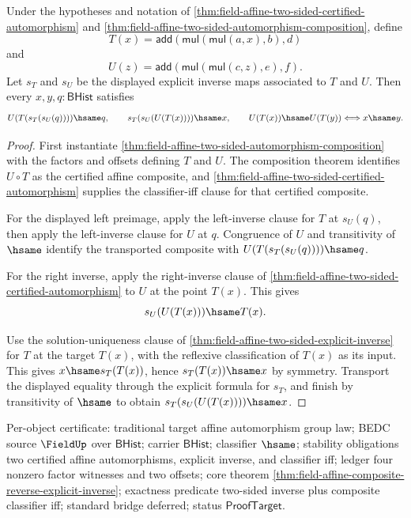 \begin{theorem}
\label{thm:field-affine-composite-reverse-explicit-inverse}
Under the hypotheses and notation of
\autoref{thm:field-affine-two-sided-certified-automorphism} and
\autoref{thm:field-affine-two-sided-automorphism-composition}, define
$$
T(x)=\mathsf{add}(\mathsf{mul}(\mathsf{mul}(a,x),b),d)
$$
and
$$
U(z)=\mathsf{add}(\mathsf{mul}(\mathsf{mul}(c,z),e),f).
$$
Let $s_T$ and $s_U$ be the displayed explicit inverse maps associated to $T$
and $U$. Then every $x,y,q:\mathsf{BHist}$ satisfies
$$
U(T(s_T(s_U(q))))\hsame q,
\qquad
s_T(s_U(U(T(x))))\hsame x,
\qquad
U(T(x))\hsame U(T(y))\Longleftrightarrow x\hsame y.
$$
\end{theorem}
\begin{proof}
First instantiate
\autoref{thm:field-affine-two-sided-automorphism-composition} with
the factors and offsets defining $T$ and $U$. The composition theorem identifies
$U\circ T$ as the certified affine composite, and
\autoref{thm:field-affine-two-sided-certified-automorphism} supplies the
classifier-iff clause for that certified composite.

For the displayed left preimage, apply the left-inverse clause for $T$ at
$s_U(q)$, then apply the left-inverse clause for $U$ at $q$. Congruence of $U$
and transitivity of $\hsame$ identify the transported composite with
$U(T(s_T(s_U(q))))\hsame q$.

For the right inverse, apply the right-inverse clause of
\autoref{thm:field-affine-two-sided-certified-automorphism} to $U$ at the point
$T(x)$. This gives
$$
s_U(U(T(x)))\hsame T(x).
$$

Use the solution-uniqueness clause of
\autoref{thm:field-affine-two-sided-explicit-inverse} for $T$ at the target
$T(x)$, with the reflexive classification of $T(x)$ as its input. This gives
$x\hsame s_T(T(x))$, hence $s_T(T(x))\hsame x$ by symmetry. Transport the
displayed equality through the explicit formula for $s_T$, and finish by
transitivity of $\hsame$ to obtain $s_T(s_U(U(T(x))))\hsame x$.
\end{proof}

Per-object certificate: traditional target affine automorphism group law; BEDC
source $\FieldUp$ over $\mathsf{BHist}$; carrier $\mathsf{BHist}$; classifier
$\hsame$; stability obligations two certified affine automorphisms, explicit
inverse, and classifier iff; ledger four nonzero factor witnesses and two
offsets; core theorem
\autoref{thm:field-affine-composite-reverse-explicit-inverse}; exactness
predicate two-sided inverse plus composite classifier iff; standard bridge
deferred; status $\mathsf{ProofTarget}$.
